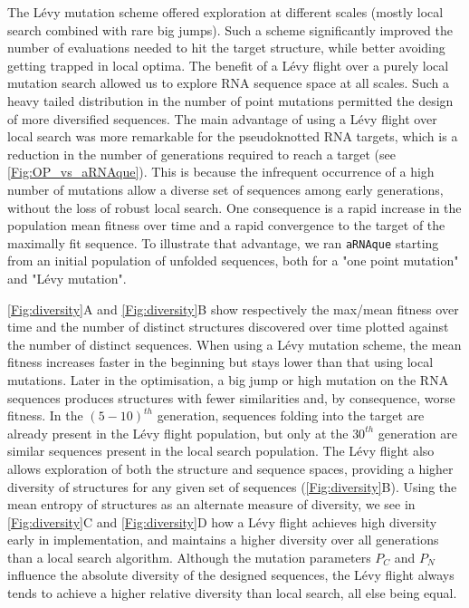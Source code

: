 The Lévy mutation scheme offered exploration at different scales (mostly local search combined with rare big jumps). Such a scheme significantly improved the number of evaluations needed to hit the target structure, while better avoiding getting trapped in local optima. The benefit of a Lévy flight over a purely local  mutation search allowed us to explore \ac{RNA} sequence space at all scales. Such a heavy tailed distribution in the number of point mutations permitted the design of more diversified sequences. The main advantage of using a Lévy flight over local search was more remarkable for the pseudoknotted \ac{RNA} targets, which is a reduction in the number of generations required to reach a target (see \autoref{Fig:OP_vs_aRNAque}). This is because the infrequent occurrence of a high number of mutations allow a diverse set of sequences among early generations, without the loss of robust local search. One consequence is a rapid increase in the population mean fitness over time and a rapid convergence to the target of the maximally fit sequence. To illustrate that advantage, we ran \texttt{aRNAque} starting from an initial population of unfolded sequences, both for a "one point mutation" and "Lévy mutation".

 \autoref{Fig:diversity}A and  \autoref{Fig:diversity}B show respectively the max/mean fitness over time and the number of distinct structures discovered over time plotted against the number of distinct sequences. When using a Lévy mutation scheme, the mean fitness increases faster in the beginning but stays lower than that using local mutations. Later in the optimisation, a big jump or high mutation on the \ac{RNA} sequences produces structures with fewer similarities and, by consequence, worse fitness. In the $(5-10)^{th}$ generation, sequences folding into the target are already present in the Lévy flight population, but only at the $30^{th}$ generation are similar sequences present in the local search population. The Lévy flight also allows exploration of both the structure and sequence spaces, providing a higher diversity of structures for any given set of sequences (\autoref{Fig:diversity}B). Using the mean entropy of structures as an alternate measure of diversity, we see in \autoref{Fig:diversity}C and \autoref{Fig:diversity}D how a Lévy flight achieves high diversity early in implementation, and maintains a higher diversity over all generations than a local search algorithm. Although the mutation parameters $P_C$ and $P_N$ influence the absolute diversity of the designed sequences, the Lévy flight always tends to achieve a higher relative diversity than local search, all else being equal. 

